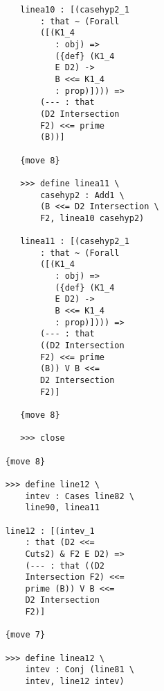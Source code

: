 \documentclass[12pt]{article}
\begin{document}
\begin{verbatim}
                           linea10 : [(casehyp2_1 
                               : that ~ (Forall 
                               ([(K1_4 
                                  : obj) => 
                                  ({def} (K1_4 
                                  E D2) -> 
                                  B <<= K1_4 
                                  : prop)]))) => 
                               (--- : that 
                               (D2 Intersection 
                               F2) <<= prime 
                               (B))]

                           {move 8}

                           >>> define linea11 \
                               casehyp2 : Add1 \
                               (B <<= D2 Intersection \
                               F2, linea10 casehyp2)

                           linea11 : [(casehyp2_1 
                               : that ~ (Forall 
                               ([(K1_4 
                                  : obj) => 
                                  ({def} (K1_4 
                                  E D2) -> 
                                  B <<= K1_4 
                                  : prop)]))) => 
                               (--- : that 
                               ((D2 Intersection 
                               F2) <<= prime 
                               (B)) V B <<= 
                               D2 Intersection 
                               F2)]

                           {move 8}

                           >>> close

                        {move 8}

                        >>> define line12 \
                            intev : Cases line82 \
                            line90, linea11

                        line12 : [(intev_1 
                            : that (D2 <<= 
                            Cuts2) & F2 E D2) => 
                            (--- : that ((D2 
                            Intersection F2) <<= 
                            prime (B)) V B <<= 
                            D2 Intersection 
                            F2)]

                        {move 7}

                        >>> define linea12 \
                            intev : Conj (line81 \
                            intev, line12 intev)


\end{verbatim}
\end{document}
